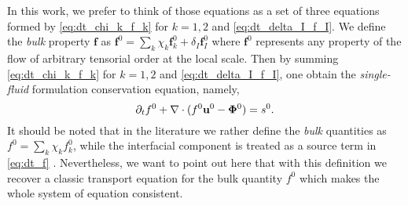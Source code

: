 In this work, we prefer to think of those equations as a set of three equations formed by \ref{eq:dt_chi_k_f_k} for $k=1,2$ and \ref{eq:dt_delta_I_f_I}. 
We define the \textit{bulk} property $\textbf{f}$ as $\textbf{f}^0 = \sum_k \chi_k \textbf{f}_k^0 + \delta_I \textbf{f}_I^0$ where $\textbf{f}^0$ represents any property of the flow of arbitrary tensorial order at the local scale.
Then by summing \ref{eq:dt_chi_k_f_k} for $k=1,2$ and \ref{eq:dt_delta_I_f_I}, one obtain the \textit{single-fluid} formulation conservation equation, namely,
\begin{equation}
   \partial_t f^0
   + \mathbf{\nabla}\cdot (
       f^0 \textbf{u}^0
       -  \mathbf{\Phi}^0 
    )
   = s^0. 
   \label{eq:dt_f}
\end{equation}
It should be noted that in the literature we rather define the \textit{bulk} quantities as $f^0 = \sum_k \chi_k f_k^0$, while the interfacial component is treated as a source term in \ref{eq:dt_f} \citep{morel2015mathematical,tryggvason2011direct,drew1983mathematical}. 
Nevertheless, we want to point out here that with this definition we recover a classic transport equation for the bulk quantity $f^0$ which makes the whole system of equation consistent.



